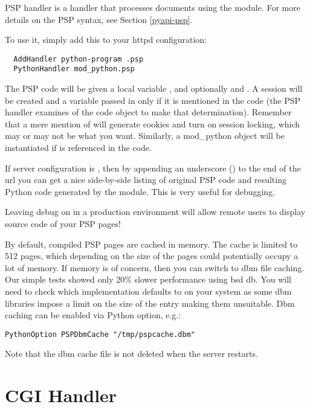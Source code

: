 PSP handler is a handler that processes documents using the
 module. For more details on the PSP syntax, see
Section \ref{pyapi-psp}.

To use it, simply add this to your httpd configuration: 

\begin{verbatim}
  AddHandler python-program .psp
  PythonHandler mod_python.psp
\end{verbatim}

The PSP code will be given a local variable , and optionally
 and . A session will be created and a
 variable passed in only if it is mentioned in the code
(the PSP handler examines  of the code object to make
that determination). Remember that a mere mention of 
will generate cookies and turn on session locking, which may or may
not be what you want. Similarly, a mod_python 
object will be instantiated if  is referenced in the code.

If  server configuration is , then by
appending an underscore (\samp{_}) to the end of the url you can get a
nice side-by-side listing of original PSP code and resulting Python
code generated by the  module. This is very useful for
debugging.

\begin{notice}
Leaving debug on in a production environment will allow remote users
to display source code of your PSP pages!
\end{notice}

By default, compiled PSP pages are cached in memory. The cache is
limited to 512 pages, which depending on the size of the pages could
potentially occupy a lot of memory. If memory is of concern, then you
can switch to dbm file caching. Our simple tests showed only 20\%
slower performance using bsd db. You will need to check which
implementation  defaults to on your system as some dbm
libraries impose a limit on the size of the entry making them
unsuitable. Dbm caching can be enabled via  Python
option, e.g.:

\begin{verbatim}
PythonOption PSPDbmCache "/tmp/pspcache.dbm"
\end{verbatim}
Note that the dbm cache file is not deleted when the server restarts.

\section{CGI Handler\label{hand-cgi}}

